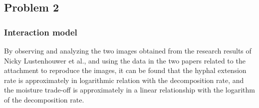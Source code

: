 \subsection{Problem 2}
\subsubsection{Interaction model}

By observing and analyzing the two images obtained from the research results of Nicky Lustenhouwer et al., and using the data in the two papers related to the attachment to reproduce the images, it can be found that the hyphal extension rate is approximately in logarithmic relation with the decomposition rate, and the moisture trade-off is approximately in a linear relationship with the logarithm of the decomposition rate.

